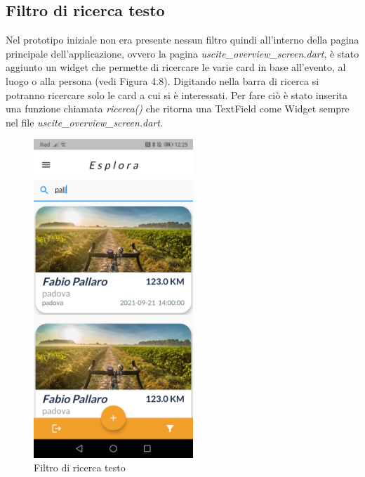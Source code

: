 \newpage

\subsection{Filtro di ricerca testo}
Nel prototipo iniziale non era presente nessun filtro quindi all'interno della pagina principale dell'applicazione, ovvero la pagina \textit{uscite\_overview\_screen.dart}, è stato aggiunto un widget che permette di ricercare le varie card in base all'evento, al luogo o alla persona (vedi Figura 4.8).
Digitando nella barra di ricerca si potranno ricercare solo le card a cui si è interessati.
Per fare ciò è stato inserita una funzione chiamata \textit{ricerca()} che ritorna una TextField come Widget sempre nel file \textit{uscite\_overview\_screen.dart}.\\

\begin{figure}[htbp]	
	\centering
	\includegraphics[width=6cm]{immagini/filtrotesto.jpeg}
	\caption{Filtro di ricerca testo}
	\label{fig:Filtro di ricerca testo}
\end{figure}

\newpage

